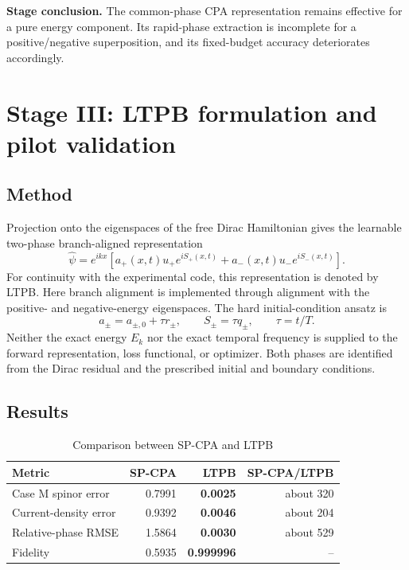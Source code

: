 \documentclass[a4paper,11pt]{article}
\begin{document}
\noindent\textbf{Stage conclusion.}
The common-phase CPA representation remains effective for a pure energy
component. Its rapid-phase extraction is incomplete for a positive/negative
superposition, and its fixed-budget accuracy deteriorates accordingly.

\section{Stage III: LTPB formulation and pilot validation}

\subsection{Method}

Projection onto the eigenspaces of the free Dirac Hamiltonian gives the
learnable two-phase branch-aligned representation
\begin{equation}
\widehat\psi=e^{ikx}
\left[
a_+(x,t)u_+e^{iS_+(x,t)}
+a_-(x,t)u_-e^{iS_-(x,t)}
\right].
\end{equation}
For continuity with the experimental code, this representation is denoted by
LTPB. Here branch alignment is implemented through alignment with the
positive- and negative-energy eigenspaces. The hard initial-condition ansatz is
\begin{equation}
a_\pm=a_{\pm,0}+\tau r_\pm,
\qquad
S_\pm=\tau q_\pm,
\qquad
\tau=t/T.
\end{equation}
Neither the exact energy \(E_k\) nor the exact temporal frequency is supplied
to the forward representation, loss functional, or optimizer. Both phases are
identified from the Dirac residual and the prescribed initial and boundary
conditions.

\subsection{Results}

\begin{table}[htbp]
\centering
\small
\caption{Comparison between SP-CPA and LTPB}
\begin{tabular}{@{}lrrr@{}}
\toprule
Metric & SP-CPA & LTPB & SP-CPA/LTPB \\
\midrule
Case M spinor error & 0.7991 & \textbf{0.0025} & about 320 \\
Current-density error & 0.9392 & \textbf{0.0046} & about 204 \\
Relative-phase RMSE & 1.5864 & \textbf{0.0030} & about 529 \\
Fidelity & 0.5935 & \textbf{0.999996} & -- \\
\bottomrule
\end{tabular}
\end{table}
\end{document}
